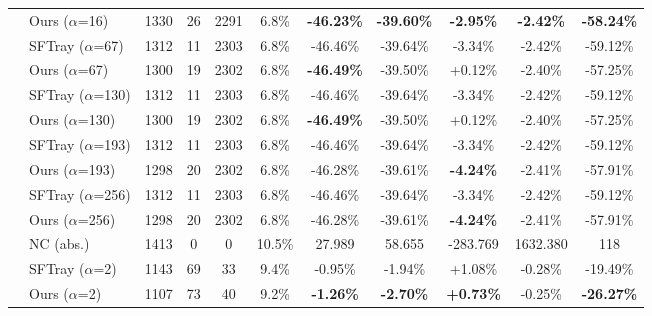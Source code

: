 \begin{table}[t]
{\begin{tabular}{ll|cccc|ccc|cc}
 & Ours ($\alpha$=16) & 1330 & 26 & 2291 & 6.8\% & \textbf{-46.23\%} & \textbf{-39.60\%} & \textbf{-2.95\%} & \textbf{-2.42\%} & \textbf{-58.24\%} \\

\addlinespace[0.3em]

 & SFTray ($\alpha$=67) & 1312 & 11 & 2303 & 6.8\% & -46.46\% & -39.64\% & -3.34\% & -2.42\% & -59.12\% \\

 & Ours ($\alpha$=67) & 1300 & 19 & 2302 & 6.8\% & \textbf{-46.49\%} & -39.50\% & +0.12\% & -2.40\% & -57.25\% \\

\addlinespace[0.3em]

 & SFTray ($\alpha$=130) & 1312 & 11 & 2303 & 6.8\% & -46.46\% & -39.64\% & -3.34\% & -2.42\% & -59.12\% \\

 & Ours ($\alpha$=130) & 1300 & 19 & 2302 & 6.8\% & \textbf{-46.49\%} & -39.50\% & +0.12\% & -2.40\% & -57.25\% \\

\addlinespace[0.3em]

 & SFTray ($\alpha$=193) & 1312 & 11 & 2303 & 6.8\% & -46.46\% & -39.64\% & -3.34\% & -2.42\% & -59.12\% \\

 & Ours ($\alpha$=193) & 1298 & 20 & 2302 & 6.8\% & -46.28\% & -39.61\% & \textbf{-4.24\%} & -2.41\% & -57.91\% \\

\addlinespace[0.3em]

 & SFTray ($\alpha$=256) & 1312 & 11 & 2303 & 6.8\% & -46.46\% & -39.64\% & -3.34\% & -2.42\% & -59.12\% \\

 & Ours ($\alpha$=256) & 1298 & 20 & 2302 & 6.8\% & -46.28\% & -39.61\% & \textbf{-4.24\%} & -2.41\% & -57.91\% \\

\addlinespace[0.3em]

\midrule

\multirow{17}{*}{mock-alu} & NC (abs.) & 1413 & 0 & 0 & 10.5\% & 27.989 & 58.655 & -283.769 & 1632.380 & 118 \\

\addlinespace[0.4em]

 & SFTray ($\alpha$=2) & 1143 & 69 & 33 & 9.4\% & -0.95\% & -1.94\% & +1.08\% & -0.28\% & -19.49\% \\

 & Ours ($\alpha$=2) & 1107 & 73 & 40 & 9.2\% & \textbf{-1.26\%} & \textbf{-2.70\%} & \textbf{+0.73\%} & -0.25\% & \textbf{-26.27\%} \\


\end{tabular}}
\end{table}
